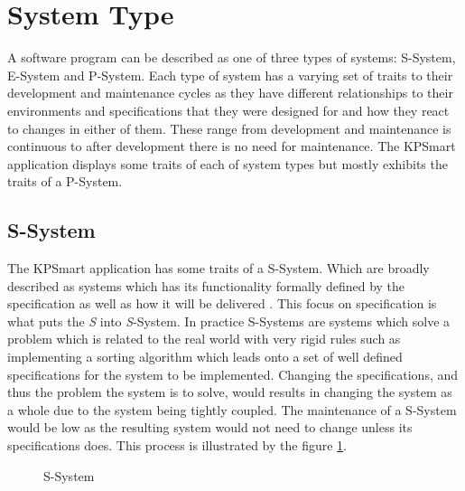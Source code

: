 \documentclass{style/CRPITStyle}
\renewcommand{\cite}{\citep}
\begin{document}
\section{System Type}

A software program can be described as one of three types of systems:
S-System, E-System and P-System. Each type of system has a varying set of traits
to their development and maintenance cycles as they have different relationships
to their environments and specifications that they were designed for and how
they react to changes in either of them. These range from development
and maintenance is continuous to after development there is no need for
maintenance. The KPSmart application displays some traits of each of system
types but mostly exhibits the traits of a P-System.

\subsection{S-System}

The KPSmart application has some traits of a S-System. Which are broadly described as
systems which has its functionality formally defined by the specification as
well as how it will be delivered \cite{lehman:1980}.
This focus on specification is what puts the \emph{S} into \emph{S}-System.
In practice S-Systems are systems which solve a problem which is related to the real world
with very rigid rules such as implementing a sorting algorithm which leads onto a set of well defined
specifications for the system to be implemented.
Changing the specifications, and thus the problem the system is to solve,
would results in changing the system as a whole due to the system being tightly
coupled. The maintenance of a S-System would be low as the resulting system
would not need to change unless its specifications does.
This process is illustrated by the figure \ref{s-system}.

\vspace{.1in}

\begin{figure}[htb]
\caption{\protect\label{s-system} S-System}
\end{figure}
\end{document}
